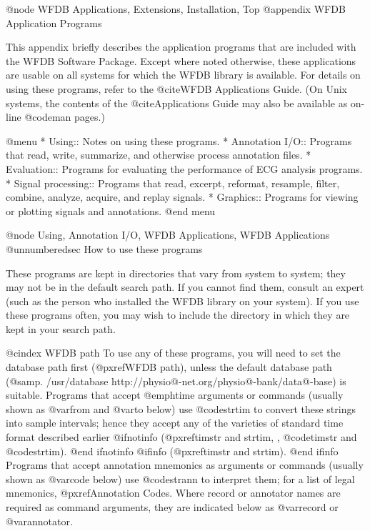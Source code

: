 {{{{{{{{@node     WFDB Applications, Extensions, Installation, Top
@appendix WFDB Application Programs

This appendix briefly describes the application programs that are
included with the WFDB Software Package.  Except where noted otherwise,
these applications are usable on all systems for which the WFDB library is
available.  For details on using these programs, refer to the @cite{WFDB
Applications Guide}.  (On Unix systems, the contents of the
@cite{Applications Guide} may also be available as on-line @code{man}
pages.)

@menu
* Using::		Notes on using these programs.
* Annotation I/O::	Programs that read, write, summarize, and
			otherwise process annotation files.
* Evaluation::		Programs for evaluating the performance of ECG
			analysis programs.
* Signal processing::	Programs that read, excerpt, reformat, resample,
			filter, combine, analyze, acquire, and replay signals.
* Graphics::		Programs for viewing or plotting signals and
			annotations.
@end menu

@node     Using, Annotation I/O, WFDB Applications, WFDB Applications
@unnumberedsec How to use these programs

These programs are kept in directories that vary from system to system;
they may not be in the default search path.  If you cannot find them,
consult an expert (such as the person who installed the WFDB library on
your system).  If you use these programs often, you may wish to include
the directory in which they are kept in your search path.

@cindex WFDB path
To use any of these programs, you will need to set the database path first
(@pxref{WFDB path}), unless the default database path
(@samp{. /usr/database http://physio@-net.org/physio@-bank/data@-base})
is suitable. Programs that accept @emph{time} arguments or commands (usually
shown as @var{from} and @var{to} below) use @code{strtim} to convert these
strings into sample intervals; hence they accept any of the varieties of
standard time format described earlier
@ifnotinfo
(@pxref{timstr and strtim, , @code{timstr} and @code{strtim}}).
@end ifnotinfo
@ifinfo
(@pxref{timstr and strtim}).
@end ifinfo
Programs that accept annotation mnemonics as arguments or commands
(usually shown as @var{code} below) use @code{strann} to interpret them;
for a list of legal mnemonics, @pxref{Annotation Codes}.  Where record
or annotator names are required as command arguments, they are indicated
below as @var{record} or @var{annotator}.

}}}}}}}}
